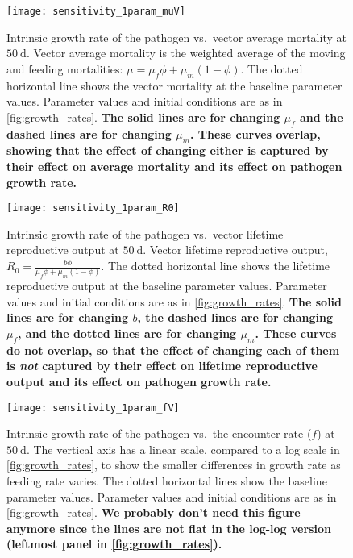 \documentclass{article}
\newcommand{\comment}[1]{\textbf{#1}}
\begin{document}
\begin{figure}
  \centering
  \texttt{[image: sensitivity\_1param\_muV]}
  \caption{Intrinsic growth rate of the pathogen vs.~vector average
    mortality at $50~\text{d}$.  Vector average mortality is the
    weighted average of the moving and feeding mortalities: $\mu =
    \mu_f \phi + \mu_m (1 - \phi)$.  The dotted horizontal
    line shows the vector mortality at the baseline parameter values.
    Parameter values and initial conditions are as in
    \autoref{fig:growth_rates}.  \comment{The solid lines are for
      changing $\mu_f$ and the dashed lines are for changing
      $\mu_m$.  These curves overlap, showing that the effect of
      changing either is captured by their effect on average mortality
      and its effect on pathogen growth rate.}}
  \label{fig:sensitivity_1param}
\end{figure}

\begin{figure}
  \centering
  \texttt{[image: sensitivity\_1param\_R0]}
  \caption{Intrinsic growth rate of the pathogen vs.~vector lifetime
    reproductive output at $50~\text{d}$.  Vector lifetime
    reproductive output, $R_0 = \frac{b \phi}{\mu_f \phi +
      \mu_m (1 - \phi)}$.  The dotted horizontal line shows the
    lifetime reproductive output at the baseline parameter values.
    Parameter values and initial conditions are as in
    \autoref{fig:growth_rates}.  \comment{The solid lines are for
      changing $b$, the dashed lines are for changing $\mu_f$,
      and the dotted lines are for changing $\mu_m$.  These curves
      do not overlap, so that the effect of
      changing each of them is \emph{not} captured by their effect on
      lifetime reproductive output and its effect on pathogen growth
      rate.}}
  \label{fig:sensitivity_1param}
\end{figure}

\begin{figure}
  \centering
  \texttt{[image: sensitivity\_1param\_fV]}
  \caption{Intrinsic growth rate of the pathogen vs.~the encounter
    rate ($f$) at $50~\text{d}$.  The vertical axis has a linear scale,
    compared to a log scale in \autoref{fig:growth_rates}, to show the
    smaller differences in growth rate as feeding rate varies.  The
    dotted horizontal lines show the baseline parameter values.
    Parameter values and initial conditions are as in
    \autoref{fig:growth_rates}.  \comment{We probably don't need this
      figure anymore since the lines are not flat in the log-log
      version (leftmost panel in \autoref{fig:growth_rates}).}}
  \label{fig:sensitivity_1param_fV}
\end{figure}
\end{document}
